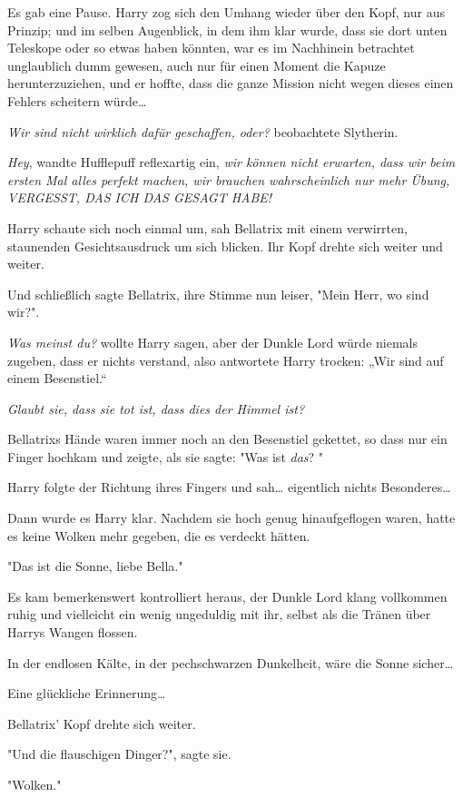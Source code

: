 {Es gab eine Pause. Harry zog sich den Umhang wieder über den Kopf, nur aus Prinzip; und im selben Augenblick, in dem ihm klar wurde, dass sie dort unten Teleskope oder so etwas haben könnten, war es im Nachhinein betrachtet unglaublich dumm gewesen, auch nur für einen Moment die Kapuze herunterzuziehen, und er hoffte, dass die ganze Mission nicht wegen dieses einen Fehlers scheitern würde…

\emph{Wir sind nicht wirklich dafür geschaffen, oder?} beobachtete Slytherin.

\emph{Hey}, wandte Hufflepuff reflexartig ein, \emph{wir können nicht erwarten, dass wir beim ersten Mal alles perfekt machen, wir brauchen wahrscheinlich nur mehr Übung, VERGESST, DAS ICH DAS GESAGT HABE!}

Harry schaute sich noch einmal um, sah Bellatrix mit einem verwirrten, staunenden Gesichtsausdruck um sich blicken. Ihr Kopf drehte sich weiter und weiter.

Und schließlich sagte Bellatrix, ihre Stimme nun leiser, "Mein Herr, wo sind wir?".

\emph{Was meinst du?} wollte Harry sagen, aber der Dunkle Lord würde niemals zugeben, dass er nichts verstand, also antwortete Harry trocken: „Wir sind auf einem Besenstiel.“

\emph{\emph{Glaubt sie, dass sie tot ist, dass dies der Himmel ist?}}

Bellatrixs Hände waren immer noch an den Besenstiel gekettet, so dass nur ein Finger hochkam und zeigte, als sie sagte: "Was ist \emph{das}? "

Harry folgte der Richtung ihres Fingers und sah… eigentlich nichts Besonderes…

Dann wurde es Harry klar. Nachdem sie hoch genug hinaufgeflogen waren, hatte es keine Wolken mehr gegeben, die es verdeckt hätten.

"Das ist die Sonne, liebe Bella."

Es kam bemerkenswert kontrolliert heraus, der Dunkle Lord klang vollkommen ruhig und vielleicht ein wenig ungeduldig mit ihr, selbst als die Tränen über Harrys Wangen flossen.

In der endlosen Kälte, in der pechschwarzen Dunkelheit, wäre die Sonne sicher…

Eine glückliche Erinnerung…

Bellatrix' Kopf drehte sich weiter.

"Und die flauschigen Dinger?", sagte sie.

"Wolken."

}
